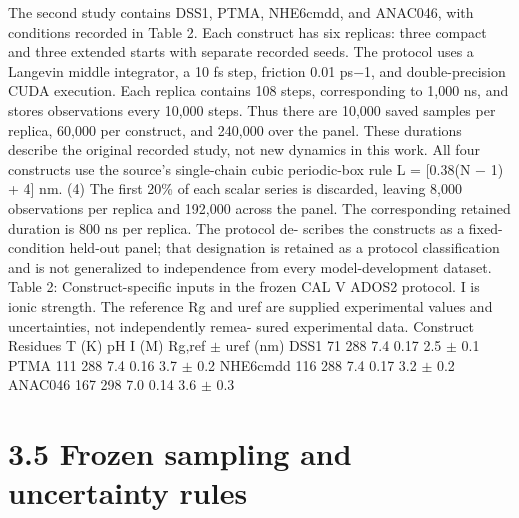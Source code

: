 \documentclass[11pt]{article}
\begin{document}
The second study contains DSS1, PTMA, NHE6cmdd, and ANAC046, with conditions recorded in
Table 2. Each construct has six replicas: three compact and three extended starts with separate
recorded seeds. The protocol uses a Langevin middle integrator, a 10 fs step, friction 0.01 ps\ensuremath{-}1, and
double-precision CUDA execution. Each replica contains 108 steps, corresponding to 1,000 ns, and
stores observations every 10,000 steps. Thus there are 10,000 saved samples per replica, 60,000 per
construct, and 240,000 over the panel. These durations describe the original recorded study, not
new dynamics in this work.
All four constructs use the source’s single-chain cubic periodic-box rule
L = [0.38(N \ensuremath{-} 1) + 4] nm. (4)
The first 20\% of each scalar series is discarded, leaving 8,000 observations per replica and 192,000
across the panel. The corresponding retained duration is 800 ns per replica. The protocol de-
scribes the constructs as a fixed-condition held-out panel; that designation is retained as a protocol
classification and is not generalized to independence from every model-development dataset.
Table 2: Construct-specific inputs in the frozen CAL V ADOS2 protocol. I is ionic strength. The
reference Rg and uref are supplied experimental values and uncertainties, not independently remea-
sured experimental data.
Construct Residues T (K) pH I (M) Rg,ref \ensuremath{\pm} uref (nm)
DSS1 71 288 7.4 0.17 2.5 \ensuremath{\pm} 0.1
PTMA 111 288 7.4 0.16 3.7 \ensuremath{\pm} 0.2
NHE6cmdd 116 288 7.4 0.17 3.2 \ensuremath{\pm} 0.2
ANAC046 167 298 7.0 0.14 3.6 \ensuremath{\pm} 0.3

\section*{3.5 Frozen sampling and uncertainty rules}
\end{document}

